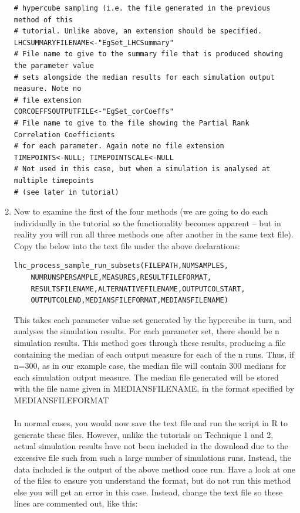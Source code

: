 \documentclass[a4paper,11pt]{article}
\begin{document}
\begin{enumerate}
\begin{verbatim}
# hypercube sampling (i.e. the file generated in the previous method of this
# tutorial. Unlike above, an extension should be specified.
LHCSUMMARYFILENAME<-"EgSet_LHCSummary"
# File name to give to the summary file that is produced showing the parameter value
# sets alongside the median results for each simulation output measure. Note no
# file extension
CORCOEFFSOUTPUTFILE<-"EgSet_corCoeffs"
# File name to give to the file showing the Partial Rank Correlation Coefficients
# for each parameter. Again note no file extension
TIMEPOINTS<-NULL; TIMEPOINTSCALE<-NULL
# Not used in this case, but when a simulation is analysed at multiple timepoints 
# (see later in tutorial)

\end{verbatim}

\newpage 
\item Now to examine the first of the four methods (we are going to do each individually in the tutorial so the functionality becomes apparent – but in reality you will run all three methods one after another in the same text file). Copy the below into the text file under the above declarations:

\begin{verbatim}
lhc_process_sample_run_subsets(FILEPATH,NUMSAMPLES,
	NUMRUNSPERSAMPLE,MEASURES,RESULTFILEFORMAT,
	RESULTSFILENAME,ALTERNATIVEFILENAME,OUTPUTCOLSTART,
	OUTPUTCOLEND,MEDIANSFILEFORMAT,MEDIANSFILENAME)
\end{verbatim}

This takes each parameter value set generated by the hypercube in turn, and analyses the simulation results.  For each parameter set, there should be n simulation results. This method goes through these results, producing a file containing the median of each output measure for each of the n runs. Thus, if n=300, as in our example case, the median file will contain 300 medians for each simulation output measure. The median file generated will be stored with the file name given in MEDIANSFILENAME, in the format specified by MEDIANSFILEFORMAT\\
\\
In normal cases, you would now save the text file and run the script in R to generate these files. However, unlike the tutorials on Technique 1 and 2, actual simulation results have not been included in the download due to the excessive file such from such a large number of simulations runs. Instead, the data included is the output of the above method once run. Have a look at one of the files to ensure you understand the format, but do not run this method else you will get an error in this case. Instead, change the text file so these lines are commented out, like this:


\end{enumerate}
\end{document}
